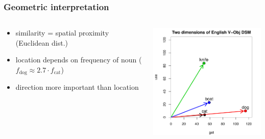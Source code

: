 \documentclass[t]{beamer} %
\begin{document}
\begin{frame}
  \frametitle{Geometric interpretation}

  \begin{columns}[T]
    \begin{column}{40mm}
      \begin{itemize}
      \item similarity = spatial proximity (Euclidean dist.)
      \item location depends on frequency of noun ($f_{\text{dog}} \approx 2.7\cdot f_{\text{cat}}$)
      \item direction more important than location
      \end{itemize}
    \end{column}
    \begin{column}{75mm}      
      \ungap[1]
      \includegraphics[width=75mm]{img/hieroglyph_2d_3}
    \end{column}
  \end{columns}
\end{frame}
\end{document}

